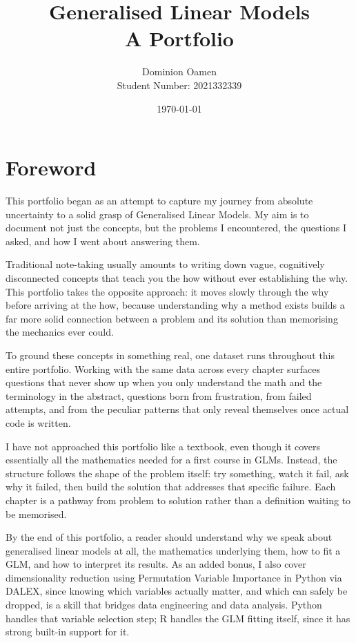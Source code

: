 \documentclass[12pt,a4paper]{report}
\title{\textbf{Generalised Linear Models}\\[0.3cm]\large A Portfolio}
\author{Dominion Oamen\\ Student Number: 2021332339}
\date{\today}
\begin{document}
\maketitle
\thispagestyle{empty}
\newpage

\chapter*{Foreword}

This portfolio began as an attempt to capture my journey from absolute uncertainty to a solid grasp of Generalised Linear Models. My aim is to document not just the concepts, but the problems I encountered, the questions I asked, and how I went about answering them.

Traditional note-taking usually amounts to writing down vague, cognitively disconnected concepts that teach you the how without ever establishing the why. This portfolio takes the opposite approach: it moves slowly through the why before arriving at the how, because understanding why a method exists builds a far more solid connection between a problem and its solution than memorising the mechanics ever could.

To ground these concepts in something real, one dataset runs throughout this entire portfolio. Working with the same data across every chapter surfaces questions that never show up when you only understand the math and the terminology in the abstract, questions born from frustration, from failed attempts, and from the peculiar patterns that only reveal themselves once actual code is written.

I have not approached this portfolio like a textbook, even though it covers essentially all the mathematics needed for a first course in GLMs. Instead, the structure follows the shape of the problem itself: try something, watch it fail, ask why it failed, then build the solution that addresses that specific failure. Each chapter is a pathway from problem to solution rather than a definition waiting to be memorised.

By the end of this portfolio, a reader should understand why we speak about generalised linear models at all, the mathematics underlying them, how to fit a GLM, and how to interpret its results. As an added bonus, I also cover dimensionality reduction using Permutation Variable Importance in Python via DALEX, since knowing which variables actually matter, and which can safely be dropped, is a skill that bridges data engineering and data analysis. Python handles that variable selection step; R handles the GLM fitting itself, since it has strong built-in support for it.
\end{document}
